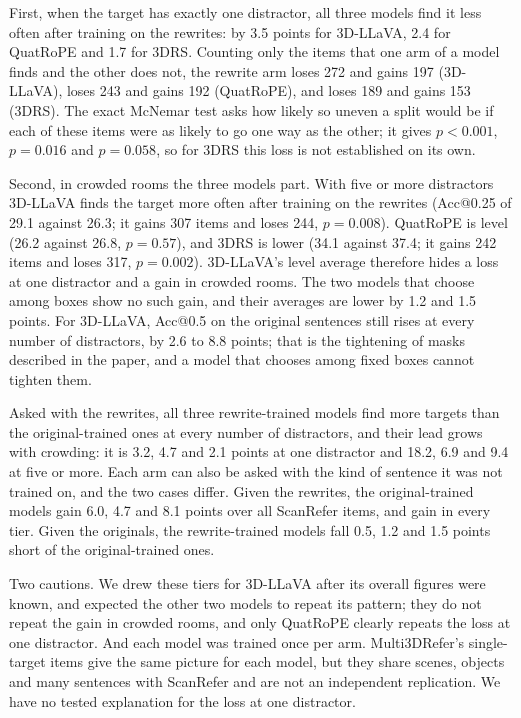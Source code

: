 First, when the target has exactly one distractor, all three models find it less often after training on the rewrites: by 3.5 points for 3D-LLaVA, 2.4 for QuatRoPE and 1.7 for 3DRS.
Counting only the items that one arm of a model finds and the other does not, the rewrite arm loses 272 and gains 197 (3D-LLaVA), loses 243 and gains 192 (QuatRoPE), and loses 189 and gains 153 (3DRS).
The exact McNemar test asks how likely so uneven a split would be if each of these items were as likely to go one way as the other; it gives $p < 0.001$, $p = 0.016$ and $p = 0.058$, so for 3DRS this loss is not established on its own.

Second, in crowded rooms the three models part.
With five or more distractors 3D-LLaVA finds the target more often after training on the rewrites (Acc@0.25 of 29.1 against 26.3; it gains 307 items and loses 244, $p = 0.008$).
QuatRoPE is level (26.2 against 26.8, $p = 0.57$), and 3DRS is lower (34.1 against 37.4; it gains 242 items and loses 317, $p = 0.002$).
3D-LLaVA's level average therefore hides a loss at one distractor and a gain in crowded rooms.
The two models that choose among boxes show no such gain, and their averages are lower by 1.2 and 1.5 points.
For 3D-LLaVA, Acc@0.5 on the original sentences still rises at every number of distractors, by 2.6 to 8.8 points; that is the tightening of masks described in the paper, and a model that chooses among fixed boxes cannot tighten them.

Asked with the rewrites, all three rewrite-trained models find more targets than the original-trained ones at every number of distractors, and their lead grows with crowding: it is 3.2, 4.7 and 2.1 points at one distractor and 18.2, 6.9 and 9.4 at five or more.
Each arm can also be asked with the kind of sentence it was not trained on, and the two cases differ.
Given the rewrites, the original-trained models gain 6.0, 4.7 and 8.1 points over all ScanRefer items, and gain in every tier.
Given the originals, the rewrite-trained models fall 0.5, 1.2 and 1.5 points short of the original-trained ones.

Two cautions.
We drew these tiers for 3D-LLaVA after its overall figures were known, and expected the other two models to repeat its pattern; they do not repeat the gain in crowded rooms, and only QuatRoPE clearly repeats the loss at one distractor.
And each model was trained once per arm.
Multi3DRefer's single-target items give the same picture for each model, but they share scenes, objects and many sentences with ScanRefer and are not an independent replication.
We have no tested explanation for the loss at one distractor.


